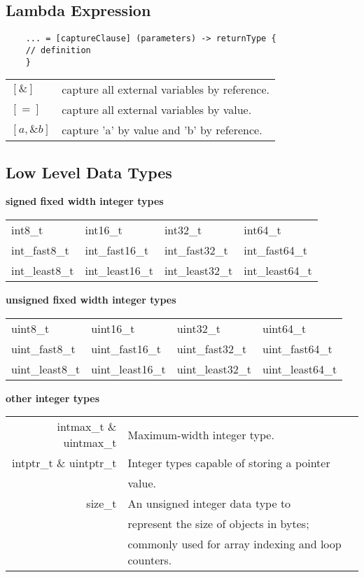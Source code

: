 \documentclass[5pt]{article}
\begin{document}
\begin{multicols}{2}
\subsection{Lambda Expression}
\begin{verbatim}
    ... = [captureClause] (parameters) -> returnType { 
    // definition
    }
\end{verbatim}
\begin{tabular}{>{\ttfamily}l l}
    $[\&]$                  & capture all external variables by reference.\\
    $[=]$                   & capture all external variables by value.\\
    $[a, \&b]$              & capture 'a' by value and 'b' by reference.\\
\end{tabular}

\subsection{Low Level Data Types}
\textbf{signed fixed width integer types}\\
\begin{tabular}{>{\small\ttfamily}l >{\small\ttfamily}l >{\small\ttfamily}l >{\small\ttfamily}l}
int8\_t         & int16\_t          & int32\_t          & int64\_t          \\
int\_fast8\_t   & int\_fast16\_t    & int\_fast32\_t    & int\_fast64\_t    \\
int\_least8\_t  & int\_least16\_t   & int\_least32\_t   & int\_least64\_t   \\
\end{tabular}
\textbf{unsigned fixed width integer types}\\
\begin{tabular}{>{\small\ttfamily}l >{\small\ttfamily}l >{\small\ttfamily}l >{\small\ttfamily}l}
uint8\_t        & uint16\_t         & uint32\_t         & uint64\_t         \\
uint\_fast8\_t  & uint\_fast16\_t   & uint\_fast32\_t   & uint\_fast64\_t   \\
uint\_least8\_t & uint\_least16\_t  & uint\_least32\_t  & uint\_least64\_t  \\
\end{tabular}
\textbf{other integer types}\\
\begin{tabular}{>{\small\ttfamily}r l}
    intmax\_t \& uintmax\_t & Maximum-width integer type.\\
    intptr\_t \& uintptr\_t & Integer types capable of storing a pointer\\
                            & value.\\
    size\_t & An unsigned integer data type to\\
            & represent the size of objects in bytes;\\
            & commonly used for array indexing and loop counters.\\  
\end{tabular}  


\end{multicols}
\end{document}

